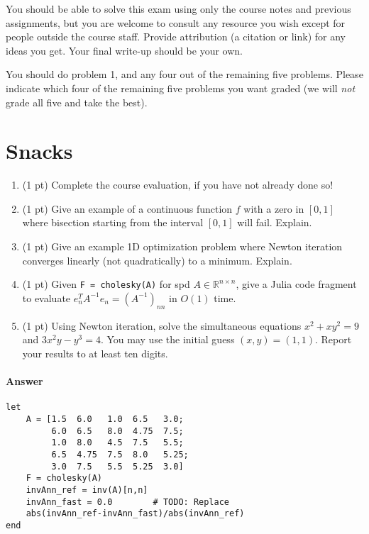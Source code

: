 \documentclass[12pt, leqno]{article} %
\providecommand{\tightlist}{%
  \setlength{\itemsep}{0pt}\setlength{\parskip}{0pt}}
\begin{document}

You should be able to solve this exam using only the course notes and
previous assignments, but you are welcome to consult any resource you
wish except for people outside the course staff. Provide attribution (a
citation or link) for any ideas you get. Your final write-up should be
your own.

You should do problem 1, and any four out of the remaining five
problems. Please indicate which four of the remaining five problems you
want graded (we will \emph{not} grade all five and take the best).

\section{Snacks}

\begin{enumerate}
\def\labelenumi{\arabic{enumi}.}
\tightlist
\item
  (1 pt) Complete the course evaluation, if you have not already done
  so!
\item
  (1 pt) Give an example of a continuous function \(f\) with a zero in
  \([0,1]\) where bisection starting from the interval \([0,1]\) will
  fail. Explain.
\item
  (1 pt) Give an example 1D optimization problem where Newton iteration
  converges linearly (not quadratically) to a minimum. Explain.
\item
  (1 pt) Given \texttt{F\ =\ cholesky(A)} for spd
  \(A \in \mathbb{R}^{n \times n}\), give a Julia code fragment to
  evaluate \(e_n^T A^{-1} e_n = (A^{-1})_{nn}\) in \(O(1)\) time.
\item
  (1 pt) Using Newton iteration, solve the simultaneous equations
  \(x^2 + xy^2 = 9\) and \(3x^2 y - y^3 = 4\). You may use the initial
  guess \((x,y) = (1,1)\). Report your results to at least ten digits.
\end{enumerate}

\paragraph{Answer}

\begin{verbatim}
let
    A = [1.5  6.0   1.0  6.5   3.0;
         6.0  6.5   8.0  4.75  7.5;
         1.0  8.0   4.5  7.5   5.5;
         6.5  4.75  7.5  8.0   5.25;
         3.0  7.5   5.5  5.25  3.0]
    F = cholesky(A)
    invAnn_ref = inv(A)[n,n]
    invAnn_fast = 0.0        # TODO: Replace
    abs(invAnn_ref-invAnn_fast)/abs(invAnn_ref)
end
\end{verbatim}
\end{document}
